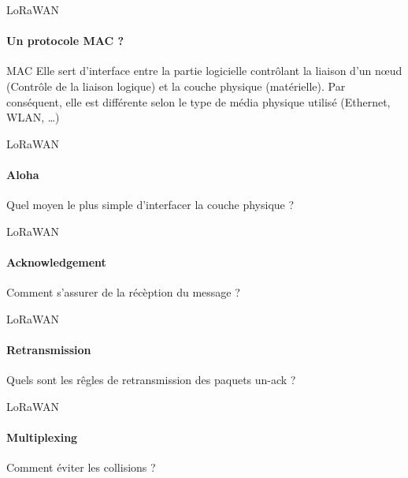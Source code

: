 \begin{frame}{LoRaWAN}
\framesubtitle{Un protocole MAC ?}

\begin{block}{MAC}
Elle sert d'interface entre la partie logicielle contrôlant la 
liaison d'un nœud (Contrôle de la liaison logique) et la couche 
physique (matérielle). Par conséquent, elle est différente selon 
le type de média physique utilisé (Ethernet, WLAN, …)
\end{block}

\end{frame}

\begin{frame}{LoRaWAN}
\framesubtitle{Aloha}
\begin{block}{}
{
  Quel moyen le plus simple d'interfacer la couche physique ?
}
\end{block}

\end{frame}

\begin{frame}{LoRaWAN}
\framesubtitle{Acknowledgement}
\begin{block}{}
{
  Comment s'assurer de la récèption du message ?
}
\end{block}

\end{frame}

\begin{frame}{LoRaWAN}
\framesubtitle{Retransmission}
\begin{block}{}
{
  Quels sont les rêgles de retransmission des paquets un-ack ?
}
\end{block}

\end{frame}

\begin{frame}{LoRaWAN}
\framesubtitle{Multiplexing}
\begin{block}{}
{
  Comment éviter les collisions ?
}
\end{block}

\begin{columns}
  \begin{column}{0.5\textwidth}
  \end{column}
  \begin{column}{0.5\textwidth}
    
  \end{column}
\end{columns}

\end{frame}

